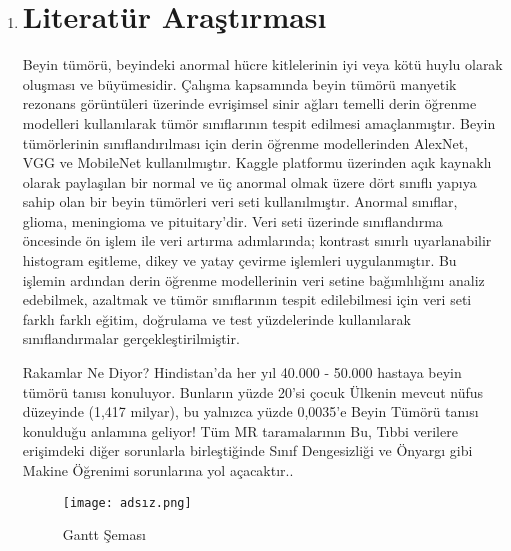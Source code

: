 \documentclass[12pt,a4paper]{article}
\begin{document}
	\begin{enumerate}
		\clearpage
		\item		
		
		
		\begin{center}
			\section*{Literatür Araştırması}			
		\end{center}		
		
	Beyin tümörü, beyindeki anormal hücre kitlelerinin iyi veya kötü huylu olarak oluşması ve büyümesidir. Çalışma kapsamında beyin tümörü manyetik rezonans görüntüleri üzerinde evrişimsel sinir ağları temelli derin öğrenme modelleri kullanılarak tümör sınıflarının tespit edilmesi amaçlanmıştır. Beyin tümörlerinin sınıflandırılması için derin öğrenme modellerinden AlexNet, VGG ve MobileNet kullanılmıştır. Kaggle platformu üzerinden açık kaynaklı olarak paylaşılan bir normal ve üç anormal olmak üzere dört sınıflı yapıya sahip olan bir beyin tümörleri veri seti kullanılmıştır. Anormal sınıflar, glioma, meningioma ve pituitary'dir. Veri seti üzerinde sınıflandırma öncesinde ön işlem ile veri artırma adımlarında; kontrast sınırlı uyarlanabilir histogram eşitleme, dikey ve yatay çevirme işlemleri uygulanmıştır. Bu işlemin ardından derin öğrenme modellerinin veri setine bağımlılığını analiz edebilmek, azaltmak ve tümör sınıflarının tespit edilebilmesi için veri seti farklı farklı eğitim, doğrulama ve test yüzdelerinde kullanılarak sınıflandırmalar gerçekleştirilmiştir.\cite{article_1214984} 
	
		
	
		
		
		
		
		
		
		
		
	Rakamlar Ne Diyor?
	Hindistan'da her yıl 40.000 - 50.000 hastaya beyin tümörü tanısı konuluyor. Bunların yüzde 20'si çocuk
	Ülkenin mevcut nüfus düzeyinde (1,417 milyar), bu yalnızca yüzde 0,0035'e Beyin Tümörü tanısı konulduğu anlamına geliyor!
	Tüm MR taramalarının %
	Bu, Tıbbi verilere erişimdeki diğer sorunlarla birleştiğinde Sınıf Dengesizliği ve Önyargı gibi Makine Öğrenimi sorunlarına yol açacaktır.. \cite{article_1214984}
		
		
		
		
		
	
		\begin{landscape}
			\begin{figure}[htbp]
				\centering
				\texttt{[image: adsız.png]}
				\caption*{Gantt Şeması} %
				\label{fig:gantt}
			\end{figure}
		\end{landscape}
		
		
			
				
	\end{enumerate}
\end{document}
